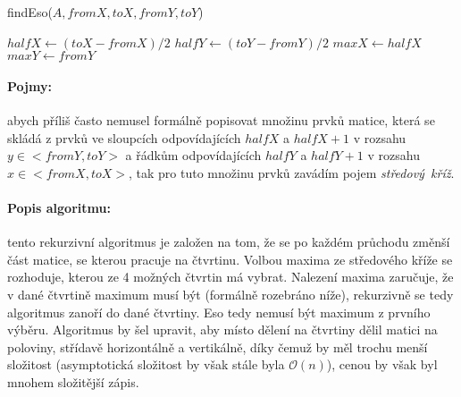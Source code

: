 \documentclass[12pt]{iv003}
\begin{document}
\begin{small}
\begin{procedure}[H]
    \caption{findEso($A, fromX, toX, fromY, toY$) }
    $halfX \leftarrow (toX - fromX)/2$ \;
    $halfY \leftarrow (toY - fromY)/2$ \;
    $maxX \leftarrow halfX$ 
    $maxY \leftarrow fromY$ \;
     {
		 {
		}
    }
\end{procedure}
\end{small}
\paragraph{Pojmy:} abych příliš často nemusel formálně popisovat množinu prvků matice, která se skládá z prvků ve sloupcích odpovídajících $halfX$ a $halfX+1$ v rozsahu $y \in <fromY, toY>$ a řádkům odpovídajících $halfY$ a $halfY+1$ v rozsahu $x \in <fromX, toX>$, tak pro tuto množinu prvků zavádím pojem \textit{středový~kříž}.
\paragraph{Popis algoritmu:} tento rekurzivní algoritmus je založen na tom, že se po každém průchodu změnší část matice, se kterou pracuje na čtvrtinu. Volbou maxima ze středového kříže se rozhoduje, kterou ze 4 možných čtvrtin má vybrat. Nalezení maxima zaručuje, že v dané čtvrtině maximum musí být (formálně rozebráno níže), rekurzivně se tedy algoritmus zanoří do dané čtvrtiny. Eso tedy nemusí být maximum z prvního výběru. Algoritmus by šel upravit, aby místo dělení na čtvrtiny dělil matici na poloviny, střídavě horizontálně a vertikálně, díky čemuž by měl trochu menší složitost (asymptotická složitost by však stále byla $\mathcal{O}(n)$), cenou by však byl mnohem složitější zápis.
\end{document}
